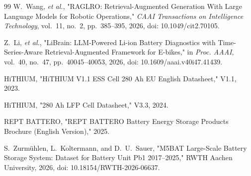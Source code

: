 \begin{thebibliography}{99}
W.~Wang, \emph{et al.},
"RAGLRO: Retrieval-Augmented Generation With Large Language Models for Robotic Operations,"
\emph{CAAI Transactions on Intelligence Technology}, vol.~11, no.~2, pp.~385--395, 2026,
doi: 10.1049/cit2.70105.

Z.~Li, \emph{et al.},
"LiBrain: LLM-Powered Li-ion Battery Diagnostics with Time-Series-Aware Retrieval-Augmented Framework for E-bikes,"
in \emph{Proc. AAAI}, vol.~40, no.~47, pp.~40045--40053, 2026,
doi: 10.1609/aaai.v40i47.41439.

HiTHIUM, "HiTHIUM V1.1 ESS Cell 280 Ah EU English Datasheet," V1.1, 2023.

HiTHIUM, "280 Ah LFP Cell Datasheet," V3.3, 2024.

REPT BATTERO, "REPT BATTERO Battery Energy Storage Products Brochure (English Version)," 2025.

S.~Zurm\"uhlen, L.~Koltermann, and D.~U.~Sauer,
"M5BAT Large-Scale Battery Storage System: Dataset for Battery Unit Pb1 2017--2025,"
RWTH Aachen University, 2026,
doi: 10.18154/RWTH-2026-06637.

\end{thebibliography}
